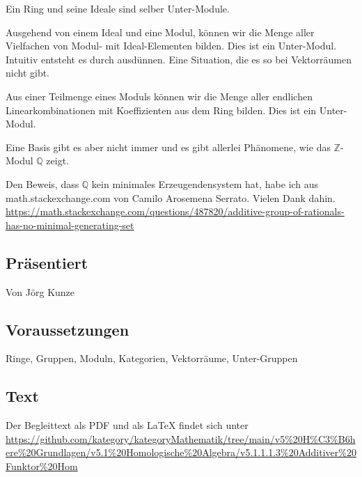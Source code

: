 \documentclass[a4paper]{amsart}
\theoremstyle{definition}
\newcommand{\Q}{\ensuremath{\mathbb{ Q }}}
\newcommand{\Z}{\ensuremath{\mathbb{ Z }}}
\begin{document}
Ein Ring und seine Ideale sind selber Unter-Module.

Ausgehend von einem Ideal und eine Modul, können wir die Menge aller Vielfachen von Modul- mit Ideal-Elementen bilden. Dies ist ein Unter-Modul. Intuitiv entsteht es durch ausdünnen. Eine Situation, die es so bei Vektorräumen nicht gibt.

Aus einer Teilmenge eines Moduls können wir die Menge aller endlichen Linearkombinationen mit Koeffizienten aus dem Ring bilden. Dies ist ein Unter-Modul.

Eine Basis gibt es aber nicht immer und es gibt allerlei Phänomene, wie das $\Z$-Modul $\Q$ zeigt.    

Den Beweis, dass $\Q$ kein minimales Erzeugendensystem hat, habe ich aus math.stackexchange.com von Camilo Arosemena Serrato. Vielen Dank dahin.
{\tiny
   \url{
      https://math.stackexchange.com/questions/487820/additive-group-of-rationals-has-no-minimal-generating-set
   }
}

\subsection*{Präsentiert}
Von Jörg Kunze

\subsection*{Voraussetzungen}
Ringe, Gruppen, Moduln, Kategorien, Vektorräume, Unter-Gruppen

\subsection*{Text}
Der Begleittext als PDF und als LaTeX findet sich unter
{\tiny
   \url{https://github.com/kategory/kategoryMathematik/tree/main/v5%20H%C3%B6here%20Grundlagen/v5.1%20Homologische%20Algebra/v5.1.1.1.3%20Additiver%20Funktor%20Hom}
}
\end{document}
